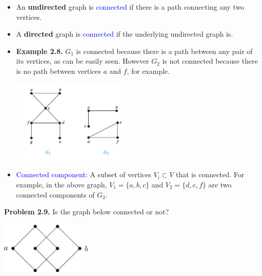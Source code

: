 \documentclass[aspectratio=169]{beamer}
\providecommand{\Blue}[1]{\textcolor{blue}{#1}}
\begin{document}
\begin{frame}[plain]{}
  \begin{itemize}
  \item An {\bf undirected} graph is \Blue{connected} if there is a path connecting any two vertices.
  \item A {\bf directed} graph is \Blue{connected} if the underlying undirected graph is. \pause 
  \item {\bf Example 2.8.} $G_1$ is connected because there is a path between
      any pair of its vertices, as can be easily seen. However $G_2$
      is not connected because there is no path between vertices
      $a$ and $f$, for example.
      \begin{center}
        \includegraphics[height=4cm]{./img/lecture2-fig7.png}
      \end{center}
   \item \Blue{Connected component}: A subset of vertices $V_i\subset V$ that is connected. For example, in the above graph,
    $V_1 = \{ a,b,c\}$ and $V_2=\{ d,e,f\}$ are two connected components of $G_2$.
  \end{itemize}
\end{frame}

\begin{frame}[plain]{}

 {\bf Problem 2.9.} Is the graph below connected or not?
    \begin{center}
        \includegraphics[height=2.5cm]{./img/lecture2-fig8.png}
      \end{center}
      
\end{frame}


    
\end{document}

